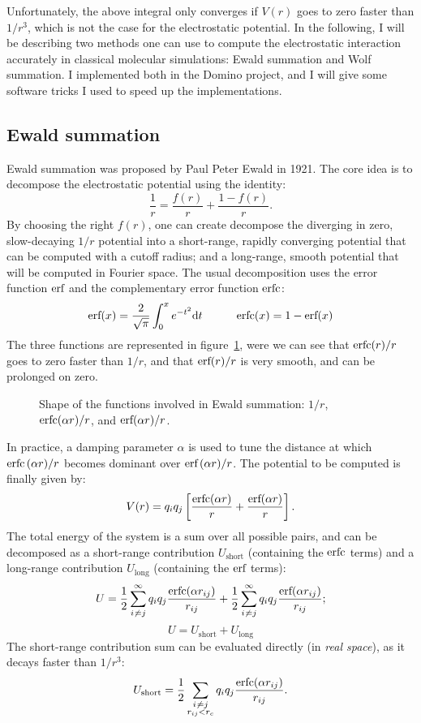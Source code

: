 \documentclass[thesis]{subfiles}
\begin{document}
Unfortunately, the above integral only converges if $V(r)$ goes to zero faster
than $1/r^3$, which is not the case for the electrostatic potential. In the
following, I will be describing two methods one can use to compute the
electrostatic interaction accurately in classical molecular simulations: Ewald
summation and Wolf summation. I implemented both in the Domino project, and I
will give some software tricks I used to speed up the implementations.

\subsection{Ewald summation}

Ewald summation was proposed by Paul Peter Ewald in 1921\cite{Ewald1921}. The
core idea is to decompose the electrostatic potential using the identity:
\[ \frac{1}{r} = \frac{f(r)}{r} + \frac{1 - f(r)}{r}. \]
By choosing the right $f(r)$, one can create decompose the diverging in zero,
slow-decaying $1/r$ potential into a short-range, rapidly converging potential
that can be computed with a cutoff radius; and a long-range, smooth potential
that will be computed in Fourier space. The usual decomposition uses the error
function ${\normalfont\text{erf}}$ and the complementary error function ${\normalfont\text{erfc}}$:
\[{\normalfont\text{erf}}(x) = \frac{2}{\sqrt\pi} \int_0^x e^{-t^2} \text{d} t \hskip3em {\normalfont\text{erfc}}(x) = 1 - {\normalfont\text{erf}}(x)\]
The three functions are represented in figure~\ref{fig:ewald:erf}, were we can
see that ${\normalfont\text{erfc}}(r)/r$ goes to zero faster than $1/r$, and that ${\normalfont\text{erf}}(r)/r$ is
very smooth, and can be prolonged on zero.

\begin{figure}[ht]
    \centering
    
    \caption{Shape of the functions involved in Ewald summation: $1/r$, ${\normalfont\text{erfc}}(\alpha r) / r$,
    and ${\normalfont\text{erf}}(\alpha r) / r$.}
    \label{fig:ewald:erf}
\end{figure}

In practice, a damping parameter $\alpha$ is used to tune the distance at which
${\normalfont\text{erfc}}\,(\alpha r) / r$ becomes dominant over ${\normalfont\text{erf}}\,(\alpha r) / r$. The
potential to be computed is finally given by:
\[ V(r) = q_i q_j \left[\frac{{\normalfont\text{erfc}}(\alpha r)}{r} + \frac{{\normalfont\text{erf}}(\alpha r)}{r} \right].\]
The total energy of the system is a sum over all possible pairs, and can be
decomposed as a short-range contribution $U_\text{short}$ (containing the
${\normalfont\text{erfc}}$ terms) and a long-range contribution $U_\text{long}$ (containing the
${\normalfont\text{erf}}$ terms):
\[ U = \frac12 \sum_{i\not\kern0.2ex= j}^\infty q_i q_j \frac{{\normalfont\text{erfc}}(\alpha r_{ij})}{r_{ij}} + \frac12 \sum_{i\not\kern0.2ex= j}^\infty q_i q_j \frac{{\normalfont\text{erf}}(\alpha r_{ij})}{r_{ij}};\]
\[ U = U_\text{short} + U_\text{long}\]
The short-range contribution sum can be evaluated directly (in \emph{real
space}), as it decays faster than $1/r^3$:
\[ U_\text{short} = \frac12 \sum_{\substack{i\not\kern0.2ex= j \\ r_{ij} < r_c}} q_i q_j \frac{{\normalfont\text{erfc}}(\alpha r_{ij})}{r_{ij}}.\]
\end{document}
